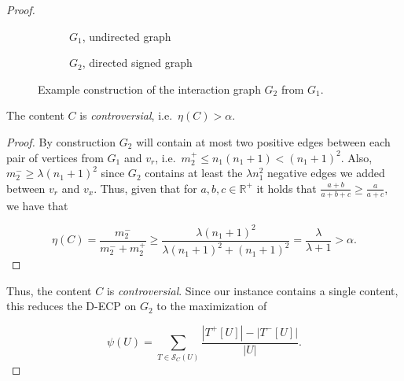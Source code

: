 \begin{proof}
	\begin{figure}
		\begin{center}
			\begin{subfigure}[b]{0.4\textwidth}
				\centering
				\vspace{30pt}
				\caption{$G_{1}$, undirected graph}
				\label{fig:g1_example}
			\end{subfigure}
			\begin{subfigure}[b]{0.4\textwidth}
				\centering
				\caption{$G_{2}$, directed signed graph}
				\label{fig:g2_example}
			\end{subfigure}
		\end{center}
		\caption[Example reduction from MIS to \acrshort{D-ECP}]{Example construction of the interaction graph $G_{2} $ from
			$G_{1}. $}
		\label{fig:construction-densest}
	\end{figure}

	\begin{claim}
		\label{th:claim-controversial-densest}
		The content $C$ is \emph{controversial}, i.e.\ $\eta(C) > \alpha $.
	\end{claim}
	\begin{proof}
		By construction $G_2$ will contain at most two positive edges between each
		pair of vertices from $G_1$ and $v_r$, i.e.\ $m_{2}^{+} \leq n_1 (n_1 +1 ) <
			(n_{1} + 1)^{2}  $. Also, $m_{2}^{-} \geq
			\lambda (n_{1} + 1)^{2} $ since $G_2$ contains at least the $\lambda
			n_1^2$ negative edges we added between $v_r$ and $v_x$.
		Thus, given that for $a, b, c \in \mathbb{R}^{+}$ it holds that $\frac{a +
				b}{a + b + c} \geq \frac{a}{a + c} $, we have that

		\begin{equation}
			\eta(C) = \frac{m_{2}^{-} }{m_{2}^{-} +
				m_{2}^{+} } \geq \frac{\lambda (n_{1} + 1) ^{2} }{\lambda
				(n_{1} + 1)^{2}
				+ (n_{1} + 1)^{2}  } = \frac{\lambda }{\lambda + 1}
			> \alpha.
		\end{equation}
	\end{proof}

	Thus, the content $C$ is \emph{controversial}. Since our instance contains
	a single content, this reduces the \acrshort{D-ECP} on $G_2$ to the maximization of

	\begin{equation}
		\label{eq:score-densest}
		\psi(U) = \sum^{}_{T \in \mathcal{S}_C(U) } \frac{| T^{+}[U] | - |
			T^{-}[U] |}{|U|}.
	\end{equation}


\end{proof}
